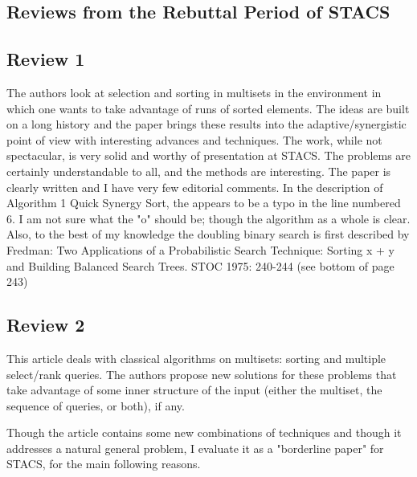 \begin{appendices}

  \section{Reviews from the Rebuttal Period of STACS}

  \subsection{Review 1}

  The authors look at selection and sorting in multisets in the
  environment in which one wants to take advantage of runs of sorted
  elements. The ideas are built on a long history and the paper brings
  these results into the adaptive/synergistic point of view with
  interesting advances and techniques.  The work, while not
  spectacular, is very solid and worthy of presentation at STACS. The
  problems are certainly understandable to all, and the methods are
  interesting.  The paper is clearly written and I have very few
  editorial comments.  In the description of Algorithm 1 Quick Synergy
  Sort, the appears to be a typo in the line numbered 6. I am not sure
  what the "o" should be; though the algorithm as a whole is clear.
  Also, to the best of my knowledge the doubling binary search is
  first described by Fredman: Two Applications of a Probabilistic
  Search Technique: Sorting x + y and Building Balanced Search
  Trees. STOC 1975: 240-244 (see bottom of page 243)

  \subsection{Review 2}

  This article deals with classical algorithms on multisets: sorting
  and multiple select/rank queries. The authors propose new solutions
  for these problems that take advantage of some inner structure of
  the input (either the multiset, the sequence of queries, or both),
  if any.

  Though the article contains some new combinations of techniques and
  though it addresses a natural general problem, I evaluate it as a
  "borderline paper" for STACS, for the main following reasons.


\end{appendices}
